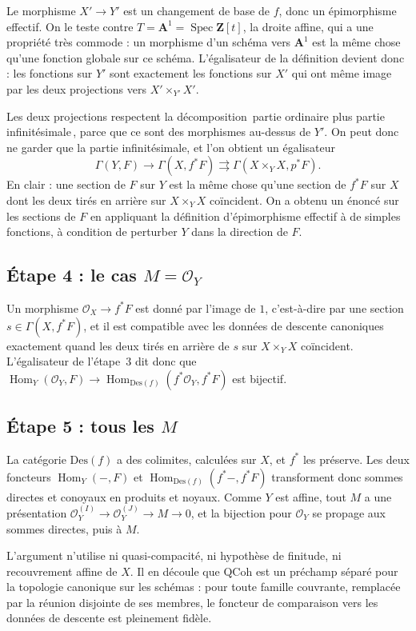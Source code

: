 \documentclass[11pt,a4paper]{amsart}
\theoremstyle{definition}
\theoremstyle{plain}
\theoremstyle{remark}
\newcommand{\Z}{\mathbf Z}
\newcommand{\QCoh}{\mathrm{QCoh}}
\newcommand{\Des}{\mathrm{Des}}
\newcommand{\Spec}{\operatorname{Spec}}
\newcommand{\Hom}{\operatorname{Hom}}
\begin{document}
Le morphisme $X'\to Y'$ est un changement de base de $f$, donc un épimorphisme effectif. On le teste contre $T=\mathbf A^1=\Spec\Z[t]$, la droite affine, qui a une propriété très commode : un morphisme d'un schéma vers $\mathbf A^1$ est la même chose qu'une fonction globale sur ce schéma. L'égalisateur de la définition devient donc : les fonctions sur $Y'$ sont exactement les fonctions sur $X'$ qui ont même image par les deux projections vers $X'\times_{Y'}X'$.

Les deux projections respectent la décomposition \guillemotleft\,partie ordinaire plus partie infinitésimale\,\guillemotright{}, parce que ce sont des morphismes au-dessus de $Y'$. On peut donc ne garder que la partie infinitésimale, et l'on obtient un égalisateur
\[
\Gamma(Y,F)\to\Gamma(X,f^*F)\rightrightarrows\Gamma(X\times_YX,p^*F).
\]
En clair : une section de $F$ sur $Y$ est la même chose qu'une section de $f^*F$ sur $X$ dont les deux tirés en arrière sur $X\times_YX$ coïncident. On a obtenu un énoncé sur les sections de $F$ en appliquant la définition d'épimorphisme effectif à de simples fonctions, à condition de perturber $Y$ dans la direction de $F$.

\subsection{Étape 4 : le cas $M=\mathcal O_Y$}

Un morphisme $\mathcal O_X\to f^*F$ est donné par l'image de $1$, c'est-à-dire par une section $s\in\Gamma(X,f^*F)$, et il est compatible avec les données de descente canoniques exactement quand les deux tirés en arrière de $s$ sur $X\times_YX$ coïncident. L'égalisateur de l'étape~3 dit donc que $\Hom_Y(\mathcal O_Y,F)\to\Hom_{\Des(f)}(f^*\mathcal O_Y,f^*F)$ est bijectif.

\subsection{Étape 5 : tous les $M$}

La catégorie $\Des(f)$ a des colimites, calculées sur $X$, et $f^*$ les préserve. Les deux foncteurs $\Hom_Y(-,F)$ et $\Hom_{\Des(f)}(f^*-,f^*F)$ transforment donc sommes directes et conoyaux en produits et noyaux. Comme $Y$ est affine, tout $M$ a une présentation $\mathcal O_Y^{(I)}\to\mathcal O_Y^{(J)}\to M\to0$, et la bijection pour $\mathcal O_Y$ se propage aux sommes directes, puis à $M$.

\medskip
L'argument n'utilise ni quasi-compacité, ni hypothèse de finitude, ni recouvrement affine de $X$. Il en découle que $\QCoh$ est un préchamp séparé pour la topologie canonique sur les schémas : pour toute famille couvrante, remplacée par la réunion disjointe de ses membres, le foncteur de comparaison vers les données de descente est pleinement fidèle.
\end{document}
